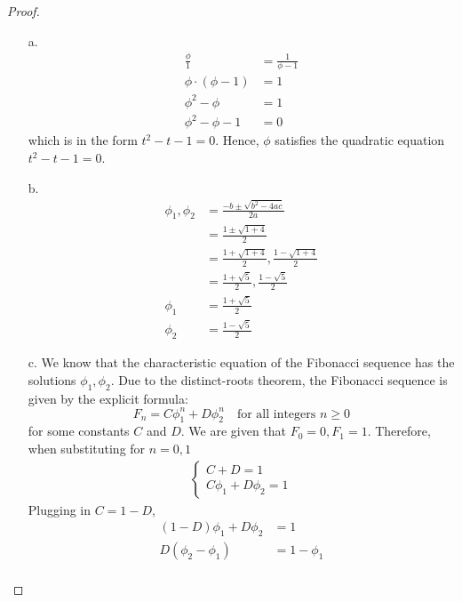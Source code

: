 \begin{proof}
    \begin{enumerate}
        \item[a.]
        \begin{align*}
            \frac{\phi}{1} &= \frac{1}{\phi - 1} \\
            \phi \cdot (\phi - 1) &= 1 \\
            \phi^2 - \phi &= 1 \\
            \phi^2 - \phi - 1 &= 0
        \end{align*}
        which is in the form $t^2 - t - 1 = 0$. Hence, $\phi$ satisfies the quadratic equation $t^2 - t - 1 = 0$.
        \item[b.]
        \begin{align*}
            \phi_1, \phi_2 &= \frac{-b \pm \sqrt{b^2 - 4ac}}{2a} \\
            &= \frac{1 \pm \sqrt{1 + 4}}{2} \\
            &= \frac{1 + \sqrt{1 + 4}}{2}, \frac{1 - \sqrt{1 + 4}}{2} \\
            &= \frac{1 + \sqrt{5}}{2}, \frac{1 - \sqrt{5}}{2} \\
            \phi_1 &= \frac{1 + \sqrt{5}}{2} \\
            \phi_2 &= \frac{1 - \sqrt{5}}{2}
        \end{align*}
        \item[c.] We know that the characteristic equation of the Fibonacci sequence has the solutions $\phi_1, \phi_2$. Due to the distinct-roots theorem, the Fibonacci sequence is given by the explicit formula:
        \begin{equation*}
            F_n = C\phi_1^n + D\phi_2^n \quad \text{for all integers $n \geq 0$}
        \end{equation*}
        for some constants $C$ and $D$. We are given that $F_0 = 0, F_1 = 1$. Therefore, when substituting for $n = 0, 1$ \\
        \begin{align*}
            \begin{cases}
                C + D = 1 \\ C\phi_1 + D\phi_2 = 1
            \end{cases}
        \end{align*}
        Plugging in $C = 1 - D$,
        \begin{align*}
            (1 - D)\phi_1 + D\phi_2 &= 1 \\
            D(\phi_2 - \phi_1) &= 1 - \phi_1 \\

\end{align*}
\end{enumerate}
\end{proof}
